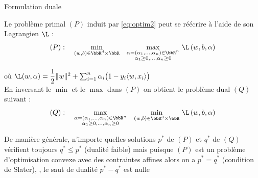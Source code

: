 \documentclass[10pt]{beamer}
\newcommand{\hsp}{\hspace*{1em}}
\begin{document}
\begin{frame}{Formulation duale}
{ Le problème primal $(P)$ induit par \eqref{eq:optim2} peut se réécrire à l'aide de son Lagrangien $\L$ : 
 $$(P) :  \hsp   \underset{(w,b) \in \bbR^d\times\bbR }{\min}\hsp \underset{\substack{\alpha=(\alpha_1,\dots,\alpha_n) \in \bbR^n\\
		\alpha_1 \geq 0, \dots, \alpha_n \geq 0 }}{\max}\,\, \L\left(w,b, \alpha\right) $$
	\vspace*{-1em}
	
où $\L(w,\alpha) = \dfrac{1}{2} \|w\|^2  + \sum_{i=1}^n \alpha_i \big(1-y_i\langle w,x_i\rangle\big)$\\[1.5em]

En inversant le $\min$ et le $\max$ dans $(P)$ on obtient le problème dual $(Q)$ suivant :
$$ (Q) :  \hsp   \underset{\substack{\alpha=(\alpha_1,\dots,\alpha_n) \in \bbR^n\\
		\alpha_1 \geq 0, \dots, \alpha_n \geq 0 }}{\max} \hsp  \underset{(w,b) \in \bbR^d\times\bbR }{\min}\, \,  \L\left(w,b, \alpha\right) $$
		\vspace*{-1em}
		
De manière générale, n'importe quelles solutions ${p^*}$ de $(P)$ et ${q^*}$ de $(Q)$ vérifient toujours $q^* \leq p^*$ (dualité faible) mais puisque $(P)$ est un problème d'optimisation convexe avec des contraintes affines alors on a $p^*=q^*$ (condition de Slater), \ie, le saut de dualité $p^*-q^*$ est nulle
}

\end{frame}
\end{document}
